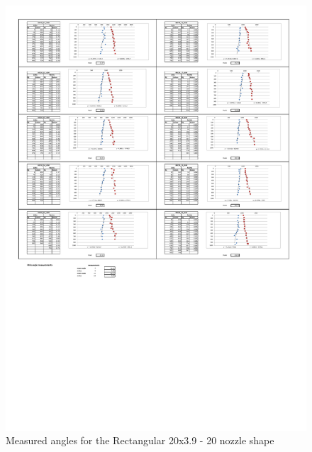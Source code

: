 \begin{figure}[ht]
    \centering
    \includegraphics[width=\linewidth]{Images/Rec20_20.pdf}
    \caption{Measured angles for the Rectangular 20x3.9 - 20 nozzle shape}
\end{figure}

